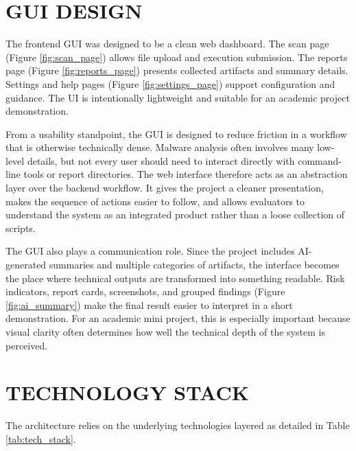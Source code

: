 \documentclass[a4paper,12pt,oneside]{report}
\begin{document}
\section{GUI DESIGN}
The frontend GUI was designed to be a clean web dashboard. The scan page (Figure \ref{fig:scan_page}) allows file upload and execution submission. The reports page (Figure \ref{fig:reports_page}) presents collected artifacts and summary details. Settings and help pages (Figure \ref{fig:settings_page}) support configuration and guidance. The UI is intentionally lightweight and suitable for an academic project demonstration.

\par

\par

From a usability standpoint, the GUI is designed to reduce friction in a workflow that is otherwise technically dense. Malware analysis often involves many low-level details, but not every user should need to interact directly with command-line tools or report directories. The web interface therefore acts as an abstraction layer over the backend workflow. It gives the project a cleaner presentation, makes the sequence of actions easier to follow, and allows evaluators to understand the system as an integrated product rather than a loose collection of scripts.

\par

\par

The GUI also plays a communication role. Since the project includes AI-generated summaries and multiple categories of artifacts, the interface becomes the place where technical outputs are transformed into something readable. Risk indicators, report cards, screenshots, and grouped findings (Figure \ref{fig:ai_summary}) make the final result easier to interpret in a short demonstration. For an academic mini project, this is especially important because visual clarity often determines how well the technical depth of the system is perceived.
\section{TECHNOLOGY STACK}
The architecture relies on the underlying technologies layered as detailed in Table \ref{tab:tech_stack}.
\end{document}
